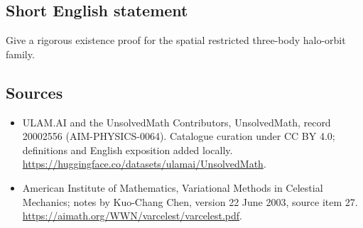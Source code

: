 \documentclass[11pt]{article}
\begin{document}
\subsection{Short English statement}
Give a rigorous existence proof for the spatial restricted three-body halo-orbit family.
\subsection{Sources}
\begin{itemize}
\item[\hypertarget{source:20002556:1}{S1}] ULAM.AI and the UnsolvedMath Contributors, UnsolvedMath, record 20002556 (AIM-PHYSICS-0064). Catalogue curation under CC BY 4.0; definitions and English exposition added locally.
\url{https://huggingface.co/datasets/ulamai/UnsolvedMath}.
\item[\hypertarget{source:20002556:2}{S2}] American Institute of Mathematics, Variational Methods in Celestial Mechanics; notes by Kuo-Chang Chen, version 22 June 2003, source item 27.
\url{https://aimath.org/WWN/varcelest/varcelest.pdf}.
\end{itemize}
\label{end:20002556}
\end{document}
